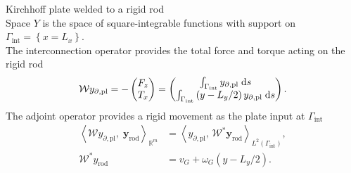 \documentclass[aspectratio=169]{ISAE-Beamer}
\begin{document}
\begin{frame}{Kirchhoff plate welded to a rigid rod}
\begin{equation*}
\end{equation*}
Space $Y$ is the space of square-integrable functions with support on $\Gamma_{\text{int}} = \left\{x=L_x\right\}$. \\
The interconnection operator  provides the total force and torque acting on the rigid rod
\begin{equation*}
\mathcal{W} y_{\partial, \text{pl}} =  - \begin{pmatrix}
F_z \\
T_x \\
\end{pmatrix} = \begin{pmatrix}
\int_{\Gamma_{\text{int}}} y_{\partial, \text{pl}} \d{s} \\
\int_{\Gamma_{\text{int}}} \left( y - L_y/2 \right) y_{\partial, \text{pl}} \d{s} \\
\end{pmatrix}.
\end{equation*}
The adjoint operator provides a rigid movement as the plate input at $\Gamma_{\text{int}}$
\begin{align*}
\left\langle \mathcal{W} y_{\partial, \text{pl}}, \; \bm{y}_{\text{rod}} \right\rangle_{\mathbb{R}^m} &= \left\langle y_{\partial, \text{pl}}, \, \mathcal{W}^* \bm{y}_{\text{rod}}\right\rangle_{L^2(\Gamma_{\text{int}})}, \\
\mathcal{W}^* {y}_{\text{rod}} &= v_G + \omega_{G} \left( y - L_y/2 \right).
\end{align*}
\end{frame}
\end{document}
